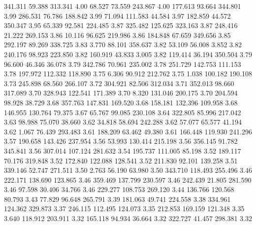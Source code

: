  341.311   59.388  313.341         4.00
  68.527   73.559  243.867         4.00
 177.613   93.664  344.801         3.99
 286.531   76.786  188.842         3.99
  71.094  111.583   44.584         3.97
 182.859   44.572  350.347         3.95
  65.339   92.581  224.485         3.87
 325.482  125.625  323.163         3.87
 248.416   21.222  269.153         3.86
  10.116   96.625  219.986         3.86
 184.848   67.659  349.656         3.85
 292.197   89.269  338.725         3.83
   3.770   88.101  358.637         3.82
  53.109   56.008    3.852         3.82
 240.176   98.923  223.850         3.82
 160.919   43.833    3.005         3.82
 119.414   36.194  350.504         3.79
  96.600   46.346   36.078         3.79
 342.786   70.961  235.002         3.78
 251.729  142.753  111.153         3.78
 197.972  112.332  118.890         3.75
   6.306   90.912  212.762         3.75
   1.038  100.182  190.108         3.73
 245.898   68.560  266.107         3.72
 304.921   82.506  312.034         3.71
 352.013   98.660  317.089         3.70
 328.943  122.541  171.389         3.70
   8.320  131.046  200.175         3.70
 204.594   98.928   38.729         3.68
 357.763  147.831  169.520         3.68
 158.181  132.396  109.958         3.68
 146.955  130.764   79.375         3.67
  65.767   99.085  230.108         3.64
 322.805   85.996  217.042         3.63
  98.988   75.070   38.660         3.62
  34.818   58.694  242.288         3.62
  57.077   65.577   41.194         3.62
   1.067   76.439  293.483         3.61
 188.209   63.462   49.380         3.61
 166.448  119.930  241.296         3.57
 190.658  143.426  237.954         3.56
  53.993  130.414  215.198         3.56
 356.145   91.782  345.841         3.56
 307.014  107.124  281.632         3.54
 195.737  111.005   85.198         3.52
 189.117   70.176  319.848         3.52
 172.840  122.088  128.541         3.52
 211.830   92.101  139.258         3.51
 339.146   52.747  271.511         3.50
   2.763   56.190   63.980         3.50
 343.710  118.493  255.496         3.46
 222.171  138.690  123.865         3.46
 359.469  137.799  230.597         3.46
 242.439   21.805  281.590         3.46
  97.598   30.406   34.766         3.46
 229.277  108.753  269.120         3.44
 136.766  120.568   80.793         3.43
  77.829   96.648  265.791         3.39
 181.063   49.741  224.558         3.38
 334.961  124.362  329.873         3.37
 246.115  112.495  124.073         3.35
 212.853  169.159  121.348         3.35
   3.640  118.912  203.911         3.32
 165.118   94.934   36.664         3.32
 322.727   41.457  298.381         3.32

